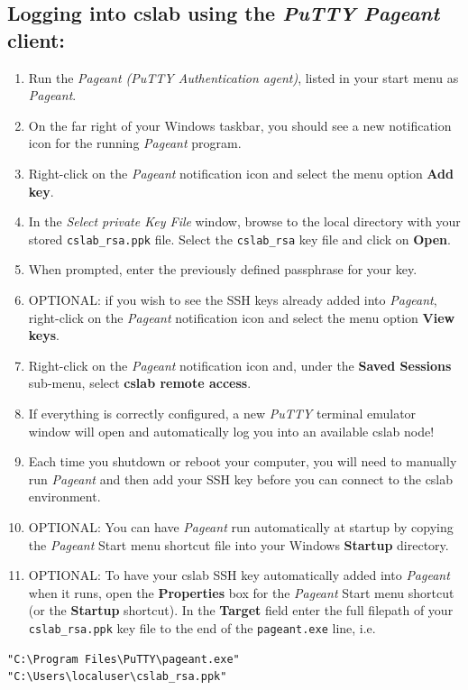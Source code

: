 \documentclass[12pt]{article}
\begin{document}
\begin{flushleft}
\newpage
\subsection*{Logging into cslab using the \textit{PuTTY Pageant} client:}
\begin{enumerate}
  \item Run the \textit{Pageant (PuTTY Authentication agent)}, listed in your start menu as \textit{Pageant}.
  \item On the far right of your Windows taskbar, you should see a new notification icon for the running \textit{Pageant} program.
  \item Right-click on the \textit{Pageant} notification icon and select the menu option \textbf{Add key}.
  \item In the \textit{Select private Key File} window, browse to the local directory with your stored \texttt{cslab\_rsa.ppk} file. Select the \texttt{cslab\_rsa} key file and click on \textbf{Open}.
  \item When prompted, enter the previously defined passphrase for your key.
  \item OPTIONAL: if you wish to see the SSH keys already added into \textit{Pageant}, right-click on the \textit{Pageant} notification icon and select the menu option \textbf{View keys}.
  \item Right-click on the \textit{Pageant} notification icon and, under the \textbf{Saved Sessions} sub-menu, select \textbf{cslab remote access}.
  \item If everything is correctly configured, a new \textit{PuTTY} terminal emulator window will open and automatically log you into an available cslab node!
  \item Each time you shutdown or reboot your computer, you will need to manually run \textit{Pageant} and then add your SSH key before you can connect to the cslab environment.
  \item OPTIONAL: You can have \textit{Pageant} run automatically at startup by copying the \textit{Pageant} Start menu shortcut file into your Windows \textbf{Startup} directory.
  \item OPTIONAL: To have your cslab SSH key automatically added into \textit{Pageant} when it runs, open the \textbf{Properties} box for the \textit{Pageant} Start menu shortcut (or the \textbf{Startup} shortcut). In the \textbf{Target} field enter the full filepath of your \texttt{cslab\_rsa.ppk} key file to the end of the \texttt{pageant.exe} line, i.e.
\end{enumerate}
  \begin{verbatim}
"C:\Program Files\PuTTY\pageant.exe" "C:\Users\localuser\cslab_rsa.ppk"
  \end{verbatim}


\end{flushleft}
\end{document}
